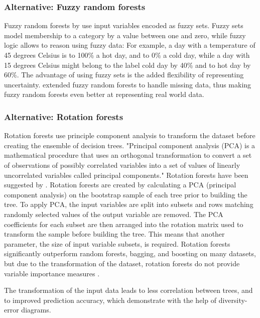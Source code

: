 \documentclass[a4paper,man,12pt,apacite,floatsintext,draftfirst]{apa6} %
\begin{document}
\subsubsection{Alternative: Fuzzy random forests}
Fuzzy random forests by  use input variables
encoded as fuzzy sets.
Fuzzy sets \cite{wpFS} model membership to a category by a value between
one and zero, while fuzzy logic \cite{wpFL} allows to reason using fuzzy data:
For example, a day with a temperature of 45 degrees Celsius is to 100\% a
hot day, and to 0\% a cold day, while a day with 15 degrees Celsius might
belong to the label cold day by 40\% and to hot day by 60\%.
The advantage of using fuzzy sets is the added flexibility of representing
uncertainty.
 extended fuzzy random forests to handle
missing data, thus making fuzzy random forests even better at representing
real world data.

\subsubsection{Alternative: Rotation forests}
Rotation forests use principle component analysis to transform
the dataset before creating the ensemble of decision trees.
"Principal component analysis (PCA) is a mathematical procedure that uses
an orthogonal transformation to convert a set of observations of possibly
correlated variables into a set of values of linearly uncorrelated variables
called principal components." \cite{wpPCA}
Rotation forests have been suggested by .
Rotation forests are created by calculating a PCA (principal component analysis)
on the bootstrap sample of each tree prior to building the tree.
To apply PCA, the input variables are split into subsets and rows matching
randomly selected values of the output variable are removed.
The PCA coefficients for each subset are then arranged into the rotation matrix
used to transform the sample before building the tree.
This means that another parameter, the size of input variable subsets, is required.
Rotation forests significantly outperform random forests, bagging, and
boosting on many datasets, but due to the transformation of the dataset,
rotation forests do not provide variable importance measures \cite{rodriguez2006rotation}.

The transformation of the input data leads to less correlation between trees,
and to improved prediction accuracy, which 
demonstrate with the help of diversity-error diagrams.
\end{document}
